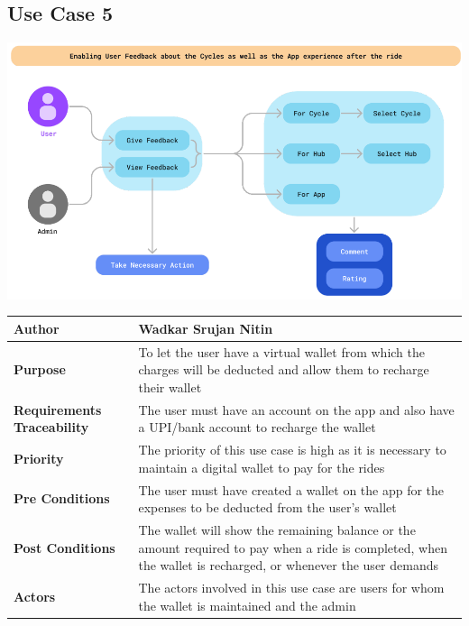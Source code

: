 \documentclass{scrreprt}
\begin{document}
\subsection{Use Case 5}
\begin{center}
\includegraphics*[scale=0.5]{usecase-5.png}
\begin{tabular}{|l|p{10cm}|}
    \hline
    \textbf{Author} &  Wadkar Srujan Nitin\\
    \hline
    \textbf{Purpose} & To let the user have a virtual wallet from which the charges will be deducted and allow them to recharge their wallet \\
    \hline
    \textbf{Requirements Traceability} & The user must have an account on the app and also have a UPI/bank account to recharge the wallet\\
    \hline
    \textbf{Priority} & The priority of this use case is high as it is necessary to maintain a digital wallet to pay for the rides\\
    \hline
    \textbf{Pre Conditions} & The user must have created a wallet on the app for the expenses to be deducted from the user’s wallet\\
    \hline
    \textbf{Post Conditions} & The wallet will show the remaining balance or the amount required to pay when a ride is completed, when the wallet is recharged, or whenever the user demands\\
    \hline
    \textbf{Actors} & The actors involved in this use case are users for whom the wallet is maintained and the admin\\
    \hline
\end{tabular}
\end{center}
\end{document}
